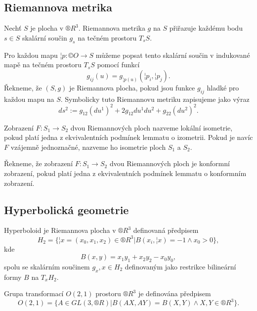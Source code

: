 \documentclass[12pt]{article}                   %
\begin{document}
    \subsection{Riemannova metrika}
        \begin{definice}
            Nechť $S$ je plocha v $®R^3$. Riemannova metrika $g$ na $S$ přiřazuje každému bodu $s \in S$ skalární součin $g_s$ na tečném prostoru $T_sS$.

            Pro každou mapu $¦p: ©O \rightarrow S$ můžeme popsat tento skalární součin v indukované mapě na tečném prostoru $T_sS$ pomocí funkcí
            $$ g_{ij}(u) = g_{¦p(u)}(¦p_i, ¦p_j). $$
            Řekneme, že $(S, g)$ je Riemannova plocha, pokud jsou funkce $g_{ij}$ hladké pro každou mapu na $S$. Symbolicky tuto Riemannovu metriku zapisujeme jako výraz
            $$ ds^2 := g_{12}(du^1)^2 + 2g_{12}du^1du^2 + g_{22}(du^2)^2. $$
        \end{definice}

        \begin{definice}
            Zobrazení $F: S_1 \rightarrow S_2$ dvou Riemannových ploch nazveme lokální isometrie, pokud platí jedna z ekvivalentních podmínek lemmatu o izometrii. Pokud je navíc $F$ vzájemně jednoznačné, nazveme ho isometrie ploch $S_1$ a $S_2$.

            Řekneme, že zobrazení $F: S_1 \rightarrow S_2$ dvou Riemannových ploch je konformní zobrazení, pokud platí jedna z ekvivalentních podmínek lemmatu o konformním zobrazení.
        \end{definice}

    \subsection{Hyperbolická geometrie}
        \begin{definice}[Hyperboloid]
            Hyperboloid je Riemannova plocha v $®R^3$ definovaná předpisem
            $$ H_2 = \{¦x = (x_0, x_1, x_2) \in ®R^3 | B(x_i, ¦x) = -1 \land x_0 > 0\}, $$
            kde
            $$ B(x, y) = x_1y_1 + x_2y_2 - x_0y_0, $$
            spolu se skalárním součinem $g_x, x \in H_2$ definovaným jako restrikce bilineární formy $B$ na $T_xH_2$.
        \end{definice}

        \begin{definice}
            Grupa transformací $O(2, 1)$ prostoru $®R^3$ je definována předpisem
            $$ O(2, 1) = \{A \in GL(3, ®R) | B(AX, AY) = B(X, Y) \land X, Y \in ®R^3\}. $$
        \end{definice}
\end{document}
